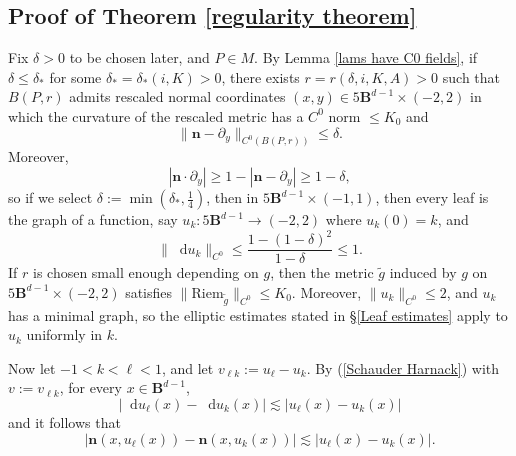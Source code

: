 \documentclass[reqno,11pt]{amsart}
\newcommand{\Ball}{\mathbf{B}}
\newcommand*\dif{\mathop{}\!\mathrm{d}}
\newcommand{\normal}{\mathbf n}
\newcommand{\Riem}{\mathrm{Riem}}
\theoremstyle{definition}
\numberwithin{equation}{section}
\begin{document}
\subsection{Proof of Theorem \ref{regularity theorem}}
Fix $\delta > 0$ to be chosen later, and $P \in M$.
By Lemma \ref{lams have C0 fields}, if $\delta \leq \delta_*$ for some $\delta_* = \delta_*(i, K) > 0$, there exists $r = r(\delta, i, K, A) > 0$ such that $B(P, r)$ admits rescaled normal coordinates $(x, y) \in 5\Ball^{d - 1} \times (-2, 2)$ in which the curvature of the rescaled metric has a $C^0$ norm $\leq K_0$ and
\begin{equation}\label{normal is almost constant}
\|\normal - \partial_y\|_{C^0(B(P, r))} \leq \delta.
\end{equation}
Moreover,
$$|\normal \cdot \partial_y| \geq 1 - |\normal - \partial_y| \geq 1 - \delta,$$
so if we select $\delta := \min(\delta_*, \frac{1}{4})$, then in $5\Ball^{d - 1} \times (-1, 1)$, then every leaf is the graph of a function, say $u_k: 5\Ball^{d - 1} \to (-2, 2)$ where $u_k(0) = k$, and
$$\|\dif u_k\|_{C^0} \leq \frac{1 - (1 - \delta)^2}{1 - \delta} \leq 1.$$
If $r$ is chosen small enough depending on $g$, then the metric $\tilde g$ induced by $g$ on $5\Ball^{d - 1} \times (-2, 2)$ satisfies $\|\Riem_{\tilde g}\|_{C^0} \leq K_0$.
Moreover, $\|u_k\|_{C^0} \leq 2$, and $u_k$ has a minimal graph, so the elliptic estimates stated in \S\ref{Leaf estimates} apply to $u_k$ uniformly in $k$.

Now let $-1 < k < \ell < 1$, and let $v_{\ell k} := u_\ell - u_k$.
By (\ref{Schauder Harnack}) with $v := v_{\ell k}$, for every $x \in \Ball^{d - 1}$,
\begin{equation}\label{bound on du}
|\dif u_\ell(x) - \dif u_k(x)| \lesssim |u_\ell(x) - u_k(x)|
\end{equation}
and it follows that
\begin{equation}\label{vertical Lipschitz}
|\normal(x, u_\ell(x)) - \normal(x, u_k(x))| \lesssim |u_\ell(x) - u_k(x)|.
\end{equation}
\end{document}
